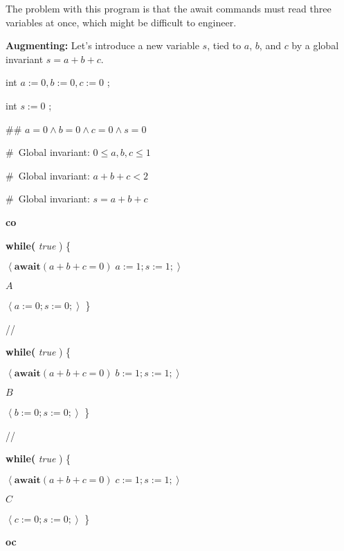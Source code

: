 \documentclass[muchmore,11pt]{article}%
\begin{document}
The problem with this program is that the await commands must read three
variables at once, which might be difficult to engineer.

\textbf{Augmenting:} Let's introduce a new variable $s$, tied to $a$, $b$, and
$c$ by a global invariant $s=a+b+c$.

\begin{code}
int $a:=0,b:=0,c:=0$ ;

int $s:=0$ ;

\#\# $a=0\wedge b=0\wedge c=0\wedge s=0$

\#\ Global invariant: $0\leq a,b,c\leq1$

\#\ Global invariant: $a+b+c<2$

\#\ Global invariant: $s=a+b+c$

\textbf{co}

\begin{indent}
\item \textbf{while(} \textit{true} ) \{

\begin{indent}
\item $\left\langle \mathbf{await}(a+b+c=0)\;a:=1;s:=1;\right\rangle $

\item $A$

\item $\left\langle a:=0;s:=0;\right\rangle $ \}
\end{indent}
\end{indent}

//

\begin{indent}
\item \textbf{while(} \textit{true} ) \{

\begin{indent}
\item $\left\langle \mathbf{await}(a+b+c=0)\;b:=1;s:=1;\right\rangle $

\item $B$

\item $\left\langle b:=0;s:=0;\right\rangle $ \}
\end{indent}
\end{indent}

//

\begin{indent}
\item \textbf{while(} \textit{true} ) \{

\begin{indent}
\item $\left\langle \mathbf{await}(a+b+c=0)\;c:=1;s:=1;\right\rangle $

\item $C$

\item $\left\langle c:=0;s:=0;\right\rangle $ \}
\end{indent}
\end{indent}

\textbf{oc}
\end{code}
\end{document}
